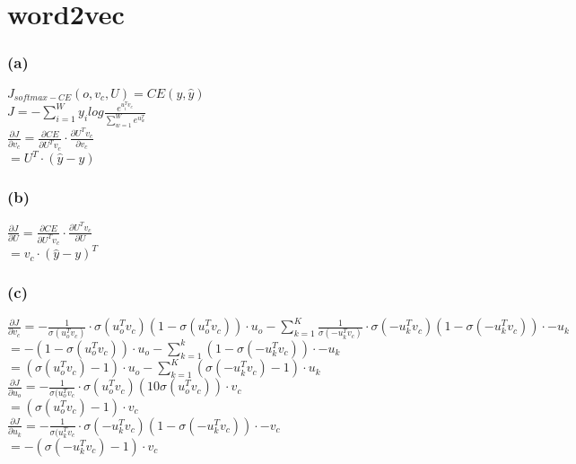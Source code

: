 \documentclass{article}
\begin{document}
\section{word2vec}
\subsubsection*{(a)}
\begin{center}

    $J_{softmax-CE}(o, v_{c}, U) = CE(y,\hat{y})$ \\[5pt]
    $J = - \sum^{W}_{i=1}y_{i}log  \frac{e^{u^T_{i}v_{c}}}{\sum^W_{w=1}e^{u^T_w}}$ \\[5pt]
    $ \frac{\partial J}{\partial v_c} = \frac{\partial CE}{\partial U^T v_c} \cdot \frac{\partial U^T v_c}{\partial v_c} $ \\[5pt]
    $ = U^T \cdot (\hat{y} - y)$\\[25pt]
\end{center}
\subsubsection*{(b)}
\begin{center}

    $\frac{\partial J}{\partial U} = \frac{\partial CE}{\partial U^T v_c} \cdot \frac{\partial U^T v_c}{\partial U}$ \\[5pt]
    $ = v_{c} \cdot (\hat{y} - y)^T$\\[25pt]

\end{center}
\subsubsection*{(c)}
\begin{center}

        $\frac{\partial J}{\partial v_c} = - \frac{1}{\sigma(u^T_o v_c)} \cdot \sigma(u^T_o v_c)(1 - \sigma(u^T_o v_c)) \cdot u_o - \sum^K_{k=1} \frac{1}{\sigma(-u^T_k v_c)} \cdot \sigma(-u^T_k v_c)(1 - \sigma(-u^T_k v_c)) \cdot -u_k$ \\[5pt]
        $ = - (1 - \sigma(u^T_o v_c)) \cdot u_o - \sum^k_{k=1}(1 - \sigma(-u^T_k v_c)) \cdot -u_k$ \\[5pt]
        $ = (\sigma(u^T_o v_c) - 1) \cdot u_o - \sum^K_{k=1}(\sigma(-u^T_k v_c) - 1) \cdot u_k$\\[15pt]
        $\frac{\partial J}{\partial u_o} = - \frac{1}{\sigma(u^T_o v_c} \cdot \sigma(u^T_o v_c)(1 0 \sigma(u^T_o v_c)) \cdot v_c$ \\[5pt]
        $ = (\sigma(u^T_o v_c) - 1) \cdot v_c$ \\[15pt]
        $ \frac{\partial J}{\partial u_k} = - \frac{1}{\sigma(u^T_k v_c} \cdot \sigma(-u^T_k v_c)(1 - \sigma(-u^T_k v_c)) \cdot -v_c$ \\[5pt]
        $ = - (\sigma(-u^T_k v_c) - 1) \cdot v_c$
        
\end{center}
\end{document}
